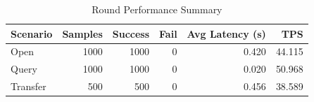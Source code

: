 \begin{table}
\caption{Round Performance Summary}
\label{tab:round_perf}
\begin{tabular}{lrrrrr}
\toprule
Scenario & Samples & Success & Fail & Avg Latency (s) & TPS \\
\midrule
Open & 1000 & 1000 & 0 & 0.420 & 44.115 \\
Query & 1000 & 1000 & 0 & 0.020 & 50.968 \\
Transfer & 500 & 500 & 0 & 0.456 & 38.589 \\
\bottomrule
\end{tabular}
\end{table}
